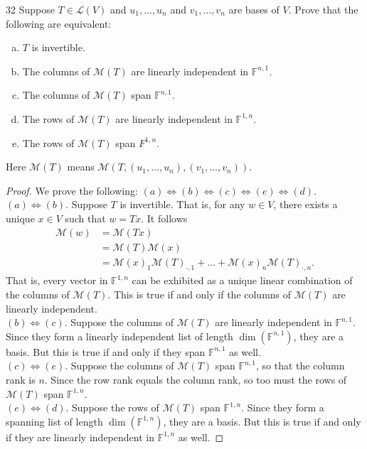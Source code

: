 \documentclass[11pt]{extarticle}
\newenvironment{problem}[1]{\begin{prob*}{#1}{}}{\end{prob*}}
\newcommand{\F}{\mathbb{F}}
\newcommand{\mat}{\mathcal{M}}
\newcommand{\Hom}{\mathcal{L}}
\begin{document}
\begin{problem}{32}
Suppose $T\in\Hom(V)$ and $u_1,\dots,u_n$ and $v_1,\dots,v_n$ are bases of $V$.  Prove that the following are equivalent:
\begin{enumerate}[(a)]
\item $T$ is invertible.
\item The columns of $\mat(T)$ are linearly independent in $\F^{n,1}$.  
\item The columns of $\mat(T)$ span $\F^{n,1}$.
\item The rows of $\mat(T)$ are linearly independent in $\F^{1,n}$.
\item The rows of $\mat(T)$ span $F^{1,n}$.
\end{enumerate}
Here $\mat(T)$ means $\mat(T,(u_1,\dots,u_n),(v_1,\dots,v_n))$.
\end{problem}
\begin{proof}
We prove the following: $(a)\iff (b) \iff (c)\iff (e)\iff (d)$.\\
\indent $(a)\iff (b)$.  Suppose $T$ is invertible.  That is, for any $w\in V$, there exists a unique $x\in V$ such that $w = Tx$.  It follows
\begin{align*}
\mat(w) &= \mat(Tx)\\
&= \mat(T)\mat(x)\\
&= \mat(x)_1\mat(T)_{\cdot, 1} + \dots + \mat(x)_n\mat(T)_{\cdot, n}.
\end{align*}
That is, every vector in $\F^{1,n}$ can be exhibited as a unique linear combination of the columns of $\mat(T)$.  This is true if and only if the columns of $\mat(T)$ are linearly independent.\\
\indent $(b)\iff (c)$.  Suppose the columns of $\mat(T)$ are linearly independent in $\F^{n,1}$.  Since they form a linearly independent list of length $\dim(\F^{n,1})$, they are a basis.  But this is true if and only if they span $\F^{n,1}$ as well.\\
\indent $(c)\iff (e)$.  Suppose the columns of $\mat(T)$ span $\F^{n,1}$, so that the column rank is $n$.  Since the row rank equals the column rank, so too must the rows of $\mat(T)$ span $\F^{1,n}$.\\
\indent $(e)\iff (d)$.  Suppose the rows of $\mat(T)$ span $\F^{1,n}$.  Since they form a spanning list of length $\dim(\F^{1,n})$, they are a basis. But this is true if and only if they are linearly independent in $\F^{1,n}$ as well.
\end{proof}
\end{document}
